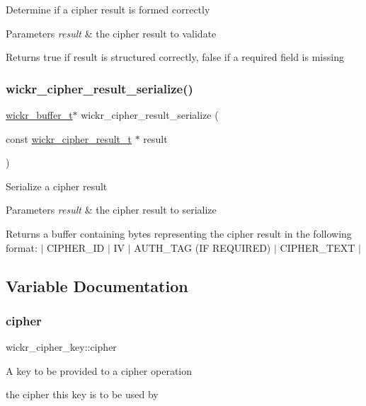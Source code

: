 Determine if a cipher result is formed correctly


\begin{DoxyParams}{Parameters}
{\em result} & the cipher result to validate \\
\hline
\end{DoxyParams}
\begin{DoxyReturn}{Returns}
true if result is structured correctly, false if a required field is missing 
\end{DoxyReturn}
\mbox{\label{group__wickr__cipher_gacda386115dc52f83a0518f8ac0dad6a2}} 
\subsubsection{\texorpdfstring{wickr\+\_\+cipher\+\_\+result\+\_\+serialize()}{wickr\_cipher\_result\_serialize()}}
{\footnotesize\ttfamily \hyperlink{structwickr__buffer}{wickr\+\_\+buffer\+\_\+t}$\ast$ wickr\+\_\+cipher\+\_\+result\+\_\+serialize (\begin{DoxyParamCaption}\item[{const \hyperlink{structwickr__cipher__result}{wickr\+\_\+cipher\+\_\+result\+\_\+t} $\ast$}]{result }\end{DoxyParamCaption})}

Serialize a cipher result


\begin{DoxyParams}{Parameters}
{\em result} & the cipher result to serialize \\
\hline
\end{DoxyParams}
\begin{DoxyReturn}{Returns}
a buffer containing bytes representing the cipher result in the following format\+: $\vert$ C\+I\+P\+H\+E\+R\+\_\+\+ID $\vert$ IV $\vert$ A\+U\+T\+H\+\_\+\+T\+AG (IF R\+E\+Q\+U\+I\+R\+ED) $\vert$ C\+I\+P\+H\+E\+R\+\_\+\+T\+E\+XT $\vert$ 
\end{DoxyReturn}


\subsection{Variable Documentation}
\mbox{\label{group__wickr__cipher_ga6506e1a07f7bc2c5ceeb0ca5ce81385b}} 
\subsubsection{\texorpdfstring{cipher}{cipher}}
{\footnotesize\ttfamily wickr\+\_\+cipher\+\_\+key\+::cipher}

A key to be provided to a cipher operation

the cipher this key is to be used by 